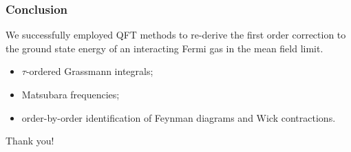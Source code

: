 \documentclass{beamer}
\begin{document}
\begin{frame}[plain]
	\frametitle{Conclusion}
	\begin{block}{}
		We successfully employed QFT methods to re-derive the first order correction to
		the ground state energy of an interacting Fermi gas in the mean field limit.
	\end{block}
	\vfill
	\begin{itemize}
		\item<3-> $\tau$-ordered Grassmann integrals;
		\item<4-> Matsubara frequencies;
		\item<5-> order-by-order identification of Feynman diagrams and Wick contractions.
	\end{itemize}
	\vfill
\end{frame}

\begin{frame}[plain]
	\centering
	\vspace{2.0em}
	\Huge Thank you!
\end{frame}

\end{document}
